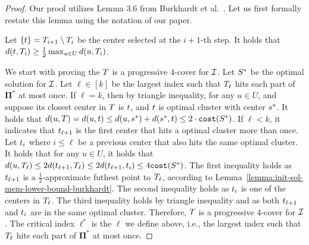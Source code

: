 \documentclass{article}
\begin{document}
\lambdaellstarlowerboundsmallerqueries* 
\begin{proof}
    Our proof utilizes Lemma 3.6 from Burkhardt et al.~\cite{burkhardt2024low}.
    Let us first formally restate this lemma using the notation of our paper. 
    \begin{lemma}
        \label{lemma:init-sol-mem-lower-bound-burkhardt}
        Let $\{t\} = T_{i+1} \setminus T_{i}$ be the center selected at the $i+1$-th step. 
        It holds that $d(t, T_{i}) \geq \frac{1}{2} \max_{u \in U} d(u, T_{i})$. 
    \end{lemma}

We start with proving the $T$ is a progressive $4$-cover for $\mathcal{I}$.
Let $S^*$ be the optimal solution for $\mathcal{I}$.
Let $\ell \in [k]$ be the largest index such that $T_{\ell}$ hits each part of $\mathbf{\Pi}^*$ at most once.
If $\ell = k$, then by triangle inequality, for any $u \in U$, and suppose its closest center in $T$ is $t$, and $t$ is optimal cluster with center $s^*$. It holds that $d(u, T) = d(u, t) \leq d(u, s^*) + d(s^*, t) \leq 2\cdot \texttt{cost}(S^*)$.
If $\ell < k$, it indicates that $t_{\ell+1}$ is the first center that hits a optimal cluster 
more than once.  
Let $t_{i}$ where $i\leq \ell$ be a previous center that also hits the same optimal cluster. 
It holds that for any $u \in U$, it holds that $d(u, T_{\ell}) \leq 2 d(t_{\ell+1}, T_{\ell}) \leq 2 d(t_{\ell + 1}, t_{i}) \leq 4 \texttt{cost}(S^*)$.
The first inequality holds as $t_{\ell+1}$ is a $\frac{1}{2}$-approximate futhest point to $T_{\ell}$, according to Lemma~\ref{lemma:init-sol-mem-lower-bound-burkhardt}.
The second inequality holds as $t_{i}$ is one of the centers in $T_{\ell}$. 
The third inequality holds by triangle inequality and as both $t_{\ell+1}$ and $t_{i}$ are in the same optimal cluster. 
Therefore, $T$ is a progressive $4$-cover for $\mathcal{I}$. 
The critical index $\ell^*$ is the $\ell$ we define above, i.e., the largest index such that $T_{\ell}$ hits each part of $\mathbf{\Pi}^*$ at most once.


\end{proof}
\end{document}
